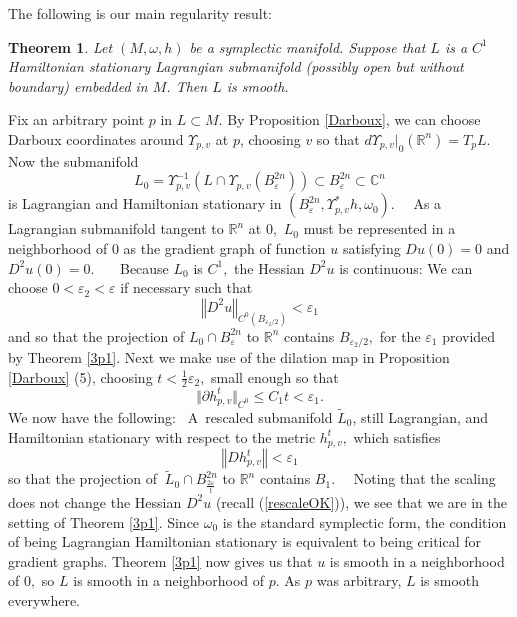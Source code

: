 \documentclass[12pt,leqno]{amsart}%
\providecommand{\U}[1]{\protect\rule{.1in}{.1in}}
\newtheorem{theorem}{Theorem}[section]
\theoremstyle{plain}
\numberwithin{equation}{section}
\theoremstyle{definition}
\begin{document}
The following is our main regularity result:

\begin{theorem}
\label{main_geometric} Let $(M,\omega,h)$ be a symplectic manifold. Suppose
that $L$ is a $C^{1}$ Hamiltonian stationary Lagrangian submanifold (possibly
open but without boundary) embedded in $M$. Then $L$ is smooth.
\end{theorem}

\proof Fix an arbitrary point $p$ in $L\subset M$. By Proposition
\ref{Darboux}, we can choose Darboux coordinates around $\Upsilon_{p,v}$ at
$p$, choosing $v$ so that $d\Upsilon_{p,v}|_{0}\left(
\mathbb{R}
^{n}\right)  =T_{p}L.$ Now the submanifold
\[
L_{0}=\Upsilon_{p,v}^{-1}(L\cap\Upsilon_{p,v}\left(  B^{2n}_{\varepsilon}\right)
)\subset B^{2n}_{\varepsilon}\subset\mathbb{C}^{n}%
\]
is Lagrangian and Hamiltonian stationary in $\left(  B^{2n}_{\varepsilon}%
,\Upsilon_{p,v}^{\ast}h,\omega_{0}\right)  $. \ \ As a Lagrangian submanifold
tangent to $%
\mathbb{R}
^{n}$ at $0,$ $L_{0}$ must be represented in a neighborhood of $0$ as the
gradient graph of function $u$ satisfying $Du(0)=0$ and $D^{2}u(0)=0$.
\ \ \ Because $L_{0}$ is $C^{1},$ the Hessian $D^{2}u$ is continuous: We can
choose $0<\varepsilon_{2}<\varepsilon$ if necessary such that
\[
\left\Vert D^{2}u\right\Vert _{C^{0}(B_{\varepsilon_{2}/2}) } <\varepsilon_{1}%
\]
and so that the projection of $L_{0}\cap B^{2n}_{\varepsilon}$ to $%
\mathbb{R}
^{n}$ contains $B_{\varepsilon_{2}/2},$ for the $\varepsilon_{1}$ provided
by Theorem \ref{3p1}. Next we make use of the dilation map in Proposition
\ref{Darboux} (5), choosing $t<\frac{1}{2}\varepsilon_{2},$ small enough so
that
\[
\Vert\partial h_{p,v}^{t}\Vert_{C^{0}}\leq C_{1}t<\varepsilon_{1}.
\]
We now have the following: \ A\ rescaled submanifold $\tilde{L}_{0}$, still
Lagrangian, and Hamiltonian stationary with respect to the metric $h_{p,v}%
^{t},$ which satisfies
\[
\left\Vert Dh_{p,v}^{t}\right\Vert <\varepsilon_{1}%
\]
so that the projection of $\ \tilde{L}_{0}\cap B^{2n}_{\frac{2\varepsilon}{t}}$ to
$%
\mathbb{R}
^{n}$ contains $B_{1}.$  \ \ Noting that the scaling does not change the
Hessian $D^{2}u$ (recall (\ref{rescaleOK})), we see that we are in the setting
of Theorem \ref{3p1}. Since $\omega_{0}$ is the standard symplectic form,
the condition of being Lagrangian Hamiltonian stationary is equivalent to
being critical for gradient graphs.  Theorem \ref{3p1}  now gives us that $u$
is smooth in a neighborhood of $0,$ so $L$ is smooth in a neighborhood of $p.$
As $p$ was arbitrary, $L$ is smooth everywhere.\endproof  




\end{document}
